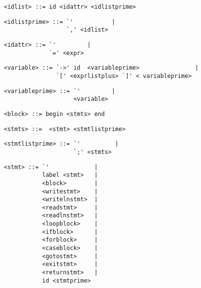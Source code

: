 \begin{footnotesize}
\begin{lstlisting}[frame=single, label={idlist}, language=pie]
<idlist> ::= id <idattr> <idlistprime>
\end{lstlisting}

\begin{lstlisting}[frame=single, label={idlistprime}, language=pie]
<idlistprime> ::= `'           |
                  `,' <idlist>
\end{lstlisting}

\begin{lstlisting}[frame=single, label={idattr}, language=pie]
<idattr> ::= `'         |
             `=' <expr>
\end{lstlisting}

\begin{lstlisting}[frame=single, label={variable}, language=pie]
<variable> ::= `->' id  <variableprime>                |
               `[' <exprlistplus> `]' < variableprime>
\end{lstlisting}

\begin{lstlisting}[frame=single, label={variableprime}, language=pie]
<variableprime> ::= `'         |
                    <variable>
\end{lstlisting}

\begin{lstlisting}[frame=single, label={block}, language=pie]
<block> ::= begin <stmts> end
\end{lstlisting}

\begin{lstlisting}[frame=single, label={stmts}, language=pie]
<stmts> ::=  <stmt> <stmtlistprime>
\end{lstlisting}

\begin{lstlisting}[frame=single, label={stmtlistprime}, language=pie]
<stmtlistprime> ::= `'          |
                    `;' <stmts>
\end{lstlisting}

\begin{lstlisting}[frame=single, label={stmt}, language=pie]
<stmt> ::= `'             |
           label <stmt>   |
           <block>        |
           <writestmt>    |
           <writelnstmt>  |
           <readstmt>     |
           <readlnstmt>   |
           <loopblock>    |
           <ifblock>      |
           <forblock>     |
           <caseblock>    |
           <gotostmt>     |
           <exitstmt>     |
           <returnstmt>   |
           id <stmtprime>
\end{lstlisting}


\end{footnotesize}
